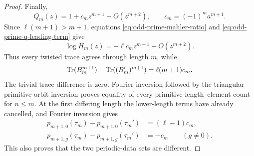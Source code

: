 \begin{proof}
Finally,
\begin{equation}\label{eq:odd-prime-q-leading-term}
 Q_m(z)=1+c_mz^{m+1}+O(z^{m+2}),
 \qquad c_m=(-1)^m a^{m+1}.
\end{equation}
Since \(\ell(m+1)>m+1\), equations
\eqref{eq:odd-prime-mahler-ratio} and
\eqref{eq:odd-prime-q-leading-term} give
\[
 \log H_m(z)=-\ell c_mz^{m+1}+O(z^{m+2}).
\]
Thus every twisted trace agrees through length \(m\), while
\[
 \operatorname{Tr}(B_m^{m+1})-\operatorname{Tr}((B_m')^{m+1})
 =\ell(m+1)c_m.
\]
The trivial trace difference is zero.  Fourier inversion followed by the
triangular primitive-orbit inversion proves equality of every primitive
length--element count for \(n\le m\).  At the first differing length the
lower-length terms have already cancelled, and Fourier inversion gives
\begin{equation}\label{eq:odd-prime-first-discrepancy}
 \begin{aligned}
 p_{m+1,0}(\tau_m)-p_{m+1,0}(\tau_m')&=(\ell-1)c_m,\\
 p_{m+1,g}(\tau_m)-p_{m+1,g}(\tau_m')&=-c_m
 \qquad(g\ne0).
 \end{aligned}
\end{equation}
This also proves that the two periodic-data sets are different.
\end{proof}
